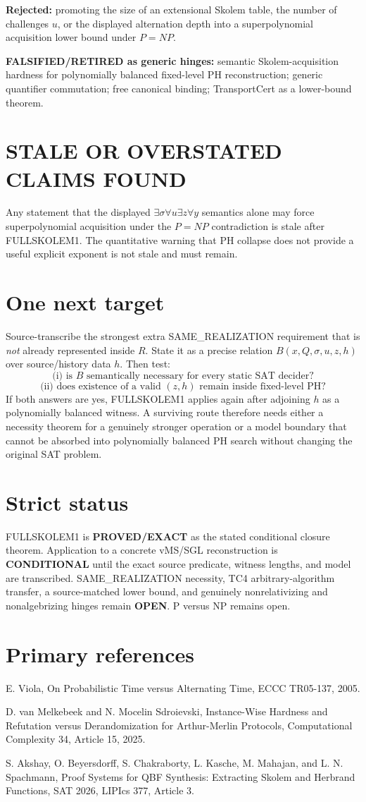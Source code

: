 \documentclass[11pt]{article}
\begin{document}
\textbf{Rejected:} promoting the size of an extensional Skolem table, the number of challenges \(u\), or the displayed alternation depth into a superpolynomial acquisition lower bound under \(P=NP\).

\textbf{FALSIFIED/RETIRED as generic hinges:} semantic Skolem-acquisition hardness for polynomially balanced fixed-level PH reconstruction; generic quantifier commutation; free canonical binding; TransportCert as a lower-bound theorem.

\section*{STALE OR OVERSTATED CLAIMS FOUND}
Any statement that the displayed \(\exists\sigma\forall u\exists z\forall y\) semantics alone may force superpolynomial acquisition under the \(P=NP\) contradiction is stale after FULLSKOLEM1. The quantitative warning that PH collapse does not provide a useful explicit exponent is not stale and must remain.

\section*{One next target}
Source-transcribe the strongest extra SAME\_REALIZATION requirement that is \emph{not} already represented inside \(R\). State it as a precise relation \(B(x,Q,\sigma,u,z,h)\) over source/history data \(h\). Then test:
\[
\text{(i) is }B\text{ semantically necessary for every static SAT decider?}
\]
\[
\text{(ii) does existence of a valid }(z,h)\text{ remain inside fixed-level PH?}
\]
If both answers are yes, FULLSKOLEM1 applies again after adjoining \(h\) as a polynomially balanced witness. A surviving route therefore needs either a necessity theorem for a genuinely stronger operation or a model boundary that cannot be absorbed into polynomially balanced PH search without changing the original SAT problem.

\section*{Strict status}
FULLSKOLEM1 is \textbf{PROVED/EXACT} as the stated conditional closure theorem. Application to a concrete vMS/SGL reconstruction is \textbf{CONDITIONAL} until the exact source predicate, witness lengths, and model are transcribed. SAME\_REALIZATION necessity, TC4 arbitrary-algorithm transfer, a source-matched lower bound, and genuinely nonrelativizing and nonalgebrizing hinges remain \textbf{OPEN}. P versus NP remains open.

\section*{Primary references}
E. Viola, On Probabilistic Time versus Alternating Time, ECCC TR05-137, 2005.

D. van Melkebeek and N. Mocelin Sdroievski, Instance-Wise Hardness and Refutation versus Derandomization for Arthur-Merlin Protocols, Computational Complexity 34, Article 15, 2025.

S. Akshay, O. Beyersdorff, S. Chakraborty, L. Kasche, M. Mahajan, and L. N. Spachmann, Proof Systems for QBF Synthesis: Extracting Skolem and Herbrand Functions, SAT 2026, LIPIcs 377, Article 3.
\end{document}
